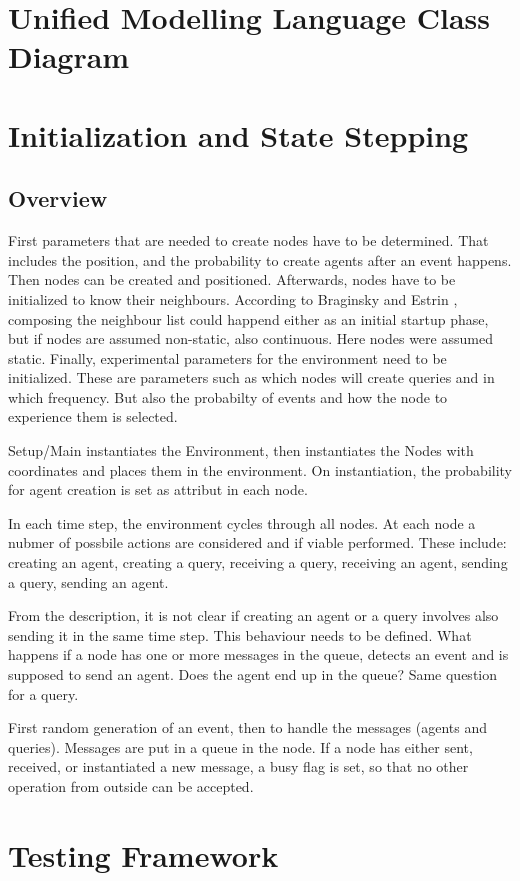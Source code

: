 \documentclass[a4paper,11pt,twoside]{article}
\begin{document}
\section{Unified Modelling Language Class Diagram}



\section{Initialization and State Stepping}
\subsection{Overview}
First parameters that are needed to create nodes have to be determined.
That includes the position, and the probability to create agents after
an event happens. Then nodes can be created and
positioned. Afterwards, nodes have to be initialized to know their
neighbours. According to Braginsky and Estrin \cite{braginsky2002},
composing the neighbour list could happend either as an initial
startup phase, but if nodes are assumed non-static, also
continuous. Here nodes were assumed static. Finally, experimental
parameters for the environment need to be initialized. These are
parameters such as which nodes will create queries and in which
frequency. But also the probabilty of events and how the node to
experience them is selected. 

Setup/Main instantiates the Environment, then instantiates the Nodes
with coordinates and places them in the environment. On
instantiation, the probability for agent creation is set as attribut
in each node.

In each time step, the environment cycles through all
nodes. At each node a nubmer of possbile actions are considered and if
viable performed. These include: creating an agent, creating a query,
receiving a query, receiving an agent, sending a query, sending an
agent.

From the description, it is not clear if creating an agent or a query
involves also sending it in the same time step. This behaviour needs
to be defined. What happens if a node has one or more messages in the
queue, detects an event and is supposed to send an agent. Does the
agent end up in the queue? Same question for a query.

First random generation of an event, then to handle the messages
(agents and queries). Messages are put in a queue in the node. If
a node has either sent, received, or instantiated a new message, a
busy flag is set, so that no other operation from outside
can be accepted.   








\section{Testing Framework}



\end{document}
